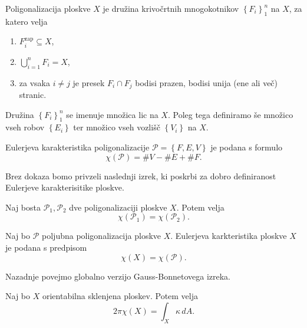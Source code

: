 \begin{definicija}
\label{def_poligonalizacija_ploskve}
Poligonalizacija ploskve $X$ je družina krivočrtnih mnogokotnikov $\left\{ F_i\right\}_1^{n}$ na $X$, za katero velja \begin{enumerate}
    \item  $F_i^{\text{zap}} \subseteq  X$,
    \item $\bigcup_{i = 1}^{n} F_i = X$,
    \item za vsaka $i \neq j$ je presek $F_i \cap  F_j$ bodisi prazen, bodisi unija (ene ali več) stranic. 
\end{enumerate}
Družina $\left\{ F_i\right\}_1^{n}$ se imenuje množica lic na $X$. Poleg tega definiramo še množico vseh robov $\left\{ E_i\right\}$ ter množico vseh vozlišč $\left\{ V_i\right\}$ na $X$.
\end{definicija}

\begin{definicija}
\label{def_Eulerjeva_karakteristika}
Eulerjeva karakteristika poligonalizacije $\mathcal{P} = \left\{ F, E, V\right\}$ je podana s formulo \begin{equation*}
\chi(\mathcal{P}) =  \#V -  \#E + \#F.
\end{equation*}  
\end{definicija}

Brez dokaza bomo privzeli naslednji izrek, ki poskrbi za dobro definiranost Eulerjeve karakterisitike ploskve.
\begin{izrek}
\label{izr_dobra_definiranost_Eulerjeve_karkteristike}
 Naj bosta $\mathcal{P}_1, \mathcal{P}_2$ dve poligonalizaciji ploskve $X$. Potem velja \begin{equation*}
 \chi(\mathcal{P}_1) = \chi(\mathcal{P}_2).
\end{equation*}  
\end{izrek}

\begin{definicija}
\label{def_Eulerjeva_karkteristika}
Naj bo $\mathcal{P}$ poljubna poligonalizacija ploskve $X$. Eulerjeva karkteristika ploskve $X$ je podana s predpisom \begin{equation*}
\chi(X) = \chi(\mathcal{P}).
\end{equation*}  
   
\end{definicija}

Nazadnje povejmo globalno verzijo Gauss-Bonnetovega izreka.

\begin{izrek}
\label{izr_globalni_GB}
Naj bo $X$ orientabilna sklenjena ploskev. Potem velja \begin{equation*}
2 \pi \chi(X) = \int_{X} \kappa \, dA.
\end{equation*}  
\end{izrek}

